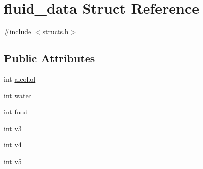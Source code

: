 \hypertarget{structfluid__data}{\section{fluid\-\_\-data Struct Reference}
\label{structfluid__data}
}


{\ttfamily \#include $<$structs.\-h$>$}

\subsection*{Public Attributes}
\begin{DoxyCompactItemize}
\item 
int \hyperlink{structfluid__data_a6d15dae8b3aa315315052fe047edd89e}{alcohol}
\item 
int \hyperlink{structfluid__data_a30eedc44b205cac9e29cb28cd054395b}{water}
\item 
int \hyperlink{structfluid__data_af5ca0a549de4f566e247e3598587e624}{food}
\item 
int \hyperlink{structfluid__data_a589cb2f93512c1c08537d1f0322832a6}{v3}
\item 
int \hyperlink{structfluid__data_ade41b11f5764b1220f32b417530ec211}{v4}
\item 
int \hyperlink{structfluid__data_af901e42057163d59ae82103e535e3088}{v5}
\end{DoxyCompactItemize}


